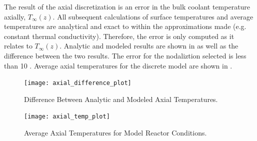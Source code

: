     The result of the axial discretization is an error in the bulk coolant
    temperature axially, $T_{\infty}(z)$. All subsequent calculations of surface
    temperatures and average temperatures are analytical and exact to within the
    approximations made (e.g. constant thermal conductivity). Therefore, the
    error is only computed as it relates to $T_{\infty}(z)$. Analytic and
    modeled results are shown in  as well as the
    difference between the two results. The error for the nodaliztion selected 
    is less than 10 . Average axial temperatures for the discrete model 
    are shown in .

    \begin{figure}
      \centering
      \texttt{[image: axial\_difference\_plot]}
      \caption{Difference Between Analytic and Modeled Axial Temperatures.}
      \label{fig:axial_difference_plot}
    \end{figure}

    \begin{figure}
      \centering
      \texttt{[image: axial\_temp\_plot]}
      \caption{Average Axial Temperatures for Model Reactor Conditions.}
      \label{fig:axial_temp_plot}
    \end{figure}
